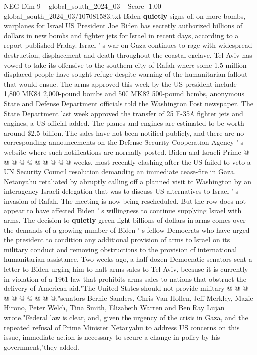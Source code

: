 \begin{textsample}{NEG Dim 9 – global\_south\_2024\_03 – Score -1.00 – global\_south\_2024\_03/107081583.txt}  \label{ex:f9_neg_414}
Biden \textbf{quietly} signs off on more bombs, warplanes for Israel US President Joe Biden has secretly authorized billions of dollars in new bombs and fighter jets for Israel in recent days, according to a report published Friday.
Israel ' s war on Gaza continues to rage with widespread destruction, displacement and death throughout the coastal enclave.
Tel Aviv has vowed to take its offensive to the southern city of Rafah where some 1.5 million displaced people have sought refuge despite warning of the humanitarian fallout that would ensue.
The arms approved this week by the US president include 1,800 MK84 2,000-pound bombs and 500 MK82 500-pound bombs, anonymous State and Defense Department officials told the Washington Post newspaper.
The State Department last week approved the transfer of 25 F-35A fighter jets and engines, a US official added.
The planes and engines are estimated to be worth around \$2.5 billion.
The sales have not been notified publicly, and there are no corresponding announcements on the Defense Security Cooperation Agency ' s website where such notifications are normally posted.
Biden and Israeli Prime @ @ @ @ @ @ @ @ @ @ weeks, most recently clashing after the US failed to veto a UN Security Council resolution demanding an immediate cease-fire in Gaza.
Netanyahu retaliated by abruptly calling off a planned visit to Washington by an interagency Israeli delegation that was to discuss US alternatives to Israel ' s invasion of Rafah.
The meeting is now being rescheduled.
But the row does not appear to have affected Biden ' s willingness to continue supplying Israel with arms.
The decision to \textbf{quietly} green light billions of dollars in arms comes over the demands of a growing number of Biden ' s fellow Democrats who have urged the president to condition any additional provision of arms to Israel on its military conduct and removing obstructions to the provision of international humanitarian assistance.
Two weeks ago, a half-dozen Democratic senators sent a letter to Biden urging him to halt arms sales to Tel Aviv, because it is currently in violation of a 1961 law that prohibits arms sales to nations that obstruct the delivery of American aid."The United States should not provide military @ @ @ @ @ @ @ @ @ @,"senators Bernie Sanders, Chris Van Hollen, Jeff Merkley, Mazie Hirono, Peter Welch, Tina Smith, Elizabeth Warren and Ben Ray Lujan wrote."Federal law is clear, and, given the urgency of the crisis in Gaza, and the repeated refusal of Prime Minister Netanyahu to address US concerns on this issue, immediate action is necessary to secure a change in policy by his government,"they added.

\end{textsample}
